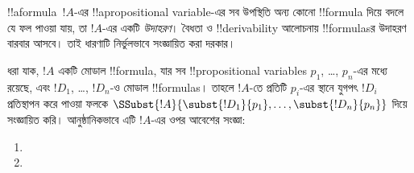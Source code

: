 \documentclass[../../../include/open-logic-section]{subfiles}
\begin{document}


!!a{formula}~$!A$-এর !!a{propositional variable}-এর সব উপস্থিতি
অন্য কোনো !!{formula} দিয়ে বদলে যে ফল পাওয়া যায়, তা $!A$-এর
একটি \emph{উদাহরণ}। বৈধতা ও !!{derivability} আলোচনায় !!{formula}sর
উদাহরণ বারবার আসবে। তাই ধারণাটি নির্ভুলভাবে সংজ্ঞায়িত করা দরকার।

\begin{defn}
  ধরা যাক, $!A$ একটি মোডাল !!{formula}, যার সব !!{propositional
    variable}s $p_1$, \dots, $p_n$-এর মধ্যে রয়েছে, এবং $!D_1$,
  \dots, $!D_n$-ও মোডাল !!{formula}s। তাহলে $!A$-তে প্রতিটি
  $p_i$-এর স্থানে যুগপৎ $!D_i$ প্রতিস্থাপন করে পাওয়া ফলকে
  $\SSubst{!A}{\subst{!D_1}{p_1}, \dots, \subst{!D_n}{p_n}}$ দিয়ে
  সংজ্ঞায়িত করি। আনুষ্ঠানিকভাবে এটি $!A$-এর ওপর আবেশের সংজ্ঞা:
  \begin{enumerate}
    \item {}
    \item {}

\end{enumerate}
\end{defn}
\end{document}
